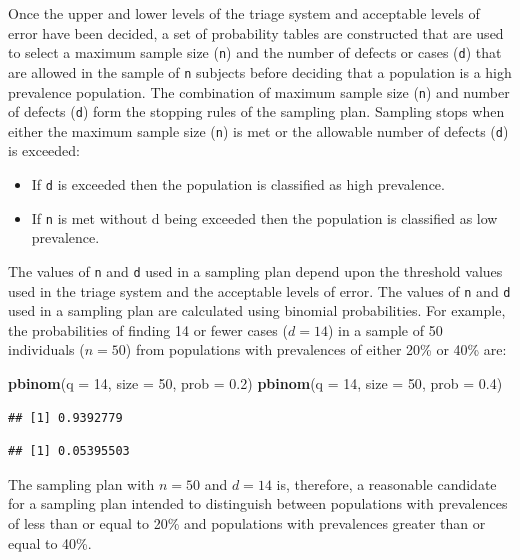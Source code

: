 \documentclass[12pt,a4paper]{book}
\newenvironment{Shaded}{\begin{snugshade}}{\end{snugshade}}
\newcommand{\DataTypeTok}[1]{\textcolor[rgb]{0.13,0.29,0.53}{#1}}
\newcommand{\DecValTok}[1]{\textcolor[rgb]{0.00,0.00,0.81}{#1}}
\newcommand{\FloatTok}[1]{\textcolor[rgb]{0.00,0.00,0.81}{#1}}
\newcommand{\KeywordTok}[1]{\textcolor[rgb]{0.13,0.29,0.53}{\textbf{#1}}}
\newcommand{\NormalTok}[1]{#1}
\theoremstyle{definition}
\theoremstyle{definition}
\theoremstyle{definition}
\theoremstyle{remark}
\begin{document}
Once the upper and lower levels of the triage system and acceptable
levels of error have been decided, a set of probability tables are
constructed that are used to select a maximum sample size (\texttt{n})
and the number of defects or cases (\texttt{d}) that are allowed in the
sample of \texttt{n} subjects before deciding that a population is a
high prevalence population. The combination of maximum sample size
(\texttt{n}) and number of defects (\texttt{d}) form the stopping rules
of the sampling plan. Sampling stops when either the maximum sample size
(\texttt{n}) is met or the allowable number of defects (\texttt{d}) is
exceeded:

\begin{itemize}
\item
  If \texttt{d} is exceeded then the population is classified as high
  prevalence.
\item
  If \texttt{n} is met without d being exceeded then the population is
  classified as low prevalence.
\end{itemize}

The values of \texttt{n} and \texttt{d} used in a sampling plan depend
upon the threshold values used in the triage system and the acceptable
levels of error. The values of \texttt{n} and \texttt{d} used in a
sampling plan are calculated using binomial probabilities. For example,
the probabilities of finding 14 or fewer cases (\(d = 14\)) in a sample
of 50 individuals (\(n = 50\)) from populations with prevalences of
either 20\% or 40\% are:

\begin{Shaded}
\begin{Highlighting}[]
\KeywordTok{pbinom}\NormalTok{(}\DataTypeTok{q =} \DecValTok{14}\NormalTok{, }\DataTypeTok{size =} \DecValTok{50}\NormalTok{, }\DataTypeTok{prob =} \FloatTok{0.2}\NormalTok{)}
\KeywordTok{pbinom}\NormalTok{(}\DataTypeTok{q =} \DecValTok{14}\NormalTok{, }\DataTypeTok{size =} \DecValTok{50}\NormalTok{, }\DataTypeTok{prob =} \FloatTok{0.4}\NormalTok{)}
\end{Highlighting}
\end{Shaded}

\begin{verbatim}
## [1] 0.9392779
\end{verbatim}

\begin{verbatim}
## [1] 0.05395503
\end{verbatim}

The sampling plan with \(n = 50\) and \(d = 14\) is, therefore, a
reasonable candidate for a sampling plan intended to distinguish between
populations with prevalences of less than or equal to 20\% and
populations with prevalences greater than or equal to 40\%.
\end{document}
